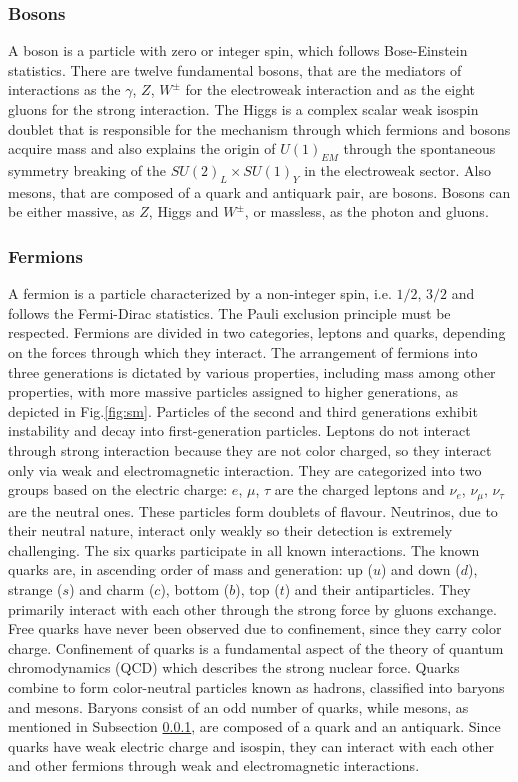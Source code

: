 \subsubsection{Bosons}\label{bosons}
A boson is a particle with zero or integer spin, which follows Bose-Einstein statistics.
There are twelve fundamental bosons, that are the mediators of interactions as the $\gamma$, $Z$, $W^{\pm}$ for the electroweak interaction and as the eight gluons for the strong interaction.
The Higgs is a complex scalar weak isospin doublet that is responsible for the mechanism through which fermions and
bosons acquire mass and also explains the origin of $U (1)_{EM}$ through the spontaneous
symmetry breaking of the $SU (2)_L \times SU (1)_Y$ in the electroweak sector. Also mesons, that are composed of a quark and antiquark pair, are bosons. Bosons can be either massive, as $Z$, Higgs and $W^{\pm}$, or massless, as the photon and gluons.

\subsubsection{Fermions}
A fermion is a particle characterized by a non-integer spin, i.e. $1/2$, $3/2$ and follows the Fermi-Dirac statistics. 
The Pauli exclusion principle must be respected. Fermions are divided in two categories, leptons and quarks, depending 
on the forces through which they interact.  The arrangement of fermions into three generations is dictated by various 
properties, including mass among other properties, with more massive particles assigned to higher generations, as 
depicted in Fig.\ref{fig:sm}. Particles of the second and third generations exhibit instability and decay into first-generation 
particles. Leptons do not interact through strong interaction because they are not color charged, so they interact only via 
weak and electromagnetic interaction. They are categorized into two groups based on the electric charge: $e$, $\mu$, $\tau$ 
are the charged leptons and $\nu_e$, $\nu_{\mu}$, $\nu_{\tau}$ are the neutral ones. These particles form doublets of flavour. 
Neutrinos, due to their neutral nature, interact only weakly so their detection is extremely challenging. The six quarks 
participate in all known interactions. The known quarks are, in ascending order of mass and generation: up ($u$) and down 
($d$), strange ($s$) and charm ($c$), bottom ($b$), top ($t$) and their antiparticles. They primarily interact with each 
other through the strong force by gluons exchange. Free quarks have never been observed due to confinement, since they carry 
color charge. Confinement of quarks is a fundamental aspect of the theory of quantum chromodynamics (QCD) which describes the 
strong nuclear force. Quarks combine to form color-neutral particles known as hadrons, classified into baryons and mesons. 
Baryons consist of an odd number of quarks, while mesons, as mentioned in Subsection \ref{bosons}, are composed of a quark 
and an antiquark. Since quarks have weak electric charge and isospin, they can interact with each other and other fermions 
through weak and electromagnetic interactions.

